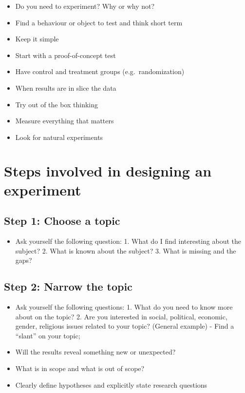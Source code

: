 \documentclass[]{book}
\providecommand{\tightlist}{%
  \setlength{\itemsep}{0pt}\setlength{\parskip}{0pt}}
\begin{document}
\begin{itemize}
\tightlist
\item
  Do you need to experiment? Why or why not?
\item
  Find a behaviour or object to test and think short term
\item
  Keep it simple
\item
  Start with a proof-of-concept test
\item
  Have control and treatment groups (e.g.~randomization)
\item
  When results are in slice the data
\item
  Try out of the box thinking
\item
  Measure everything that matters
\item
  Look for natural experiments
\end{itemize}

\hypertarget{steps-involved-in-designing-an-experiment}{%
\section{Steps involved in designing an experiment}\label{steps-involved-in-designing-an-experiment}}

\hypertarget{step-1-choose-a-topic}{%
\subsection{Step 1: Choose a topic}\label{step-1-choose-a-topic}}

\begin{itemize}
\tightlist
\item
  Ask yourself the following question: 1. What do I find interesting about the subject? 2. What is known about the subject? 3. What is missing and the gaps?
\end{itemize}

\hypertarget{step-2-narrow-the-topic}{%
\subsection{Step 2: Narrow the topic}\label{step-2-narrow-the-topic}}

\begin{itemize}
\tightlist
\item
  Ask yourself the following questions: 1. What do you need to know more about on the topic? 2. Are you interested in social, political, economic, gender, religious issues related to your topic? (General example) - Find a ``slant'' on your topic;
\item
  Will the results reveal something new or unexpected?
\item
  What is in scope and what is out of scope?
\item
  Clearly define hypotheses and explicitly state research questions
\end{itemize}
\end{document}

